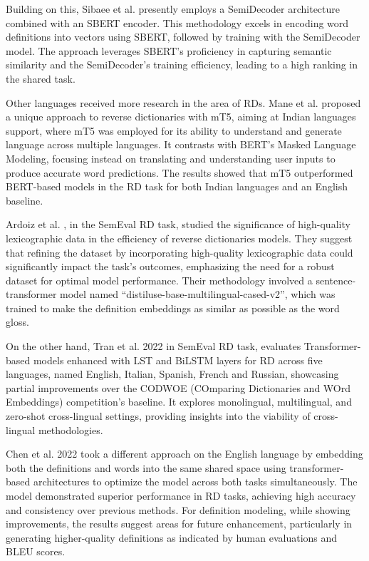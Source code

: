 \documentclass[12pt]{article}
\begin{document}
Building on this, Sibaee et al. \cite{Sibaee2023} presently employs a SemiDecoder architecture combined with an SBERT encoder. This methodology excels in encoding word definitions into vectors using SBERT, followed by training with the SemiDecoder model. The approach leverages SBERT's proficiency in capturing semantic similarity and the SemiDecoder's training efficiency, leading to a high ranking in the shared task.

Other languages received more research in the area of RDs. Mane et al. \cite{Mane2022} proposed a unique approach to reverse dictionaries with mT5, aiming at Indian languages support, where mT5 was employed for its ability to understand and generate language across multiple languages. It contrasts with BERT's Masked Language Modeling, focusing instead on translating and understanding user inputs to produce accurate word predictions. The results showed that mT5 outperformed BERT-based models in the RD task for both Indian languages and an English baseline.

Ardoiz et al. \cite{Ardoiz2022}, in the SemEval RD task, studied the significance of high-quality lexicographic data in the efficiency of reverse dictionaries models. They suggest that refining the dataset by incorporating high-quality lexicographic data could significantly impact the task's outcomes, emphasizing the need for a robust dataset for optimal model performance. Their methodology involved a sentence-transformer model named “distiluse-base-multilingual-cased-v2”, which was trained to make the definition embeddings as similar as possible as the word gloss.

On the other hand, Tran et al. 2022 \cite{Tran2022} in SemEval RD task, evaluates Transformer-based models enhanced with LST and BiLSTM layers for RD across five languages, named English, Italian, Spanish, French and Russian, showcasing partial improvements over the CODWOE (COmparing Dictionaries and WOrd Embeddings) competition's baseline. It explores monolingual, multilingual, and zero-shot cross-lingual settings, providing insights into the viability of cross-lingual methodologies.

Chen et al. 2022 \cite{Chen2022} took a different approach on the English language by embedding both the definitions and words into the same shared space using transformer-based architectures to optimize the model across both tasks simultaneously. The model demonstrated superior performance in RD tasks, achieving high accuracy and consistency over previous methods. For definition modeling, while showing improvements, the results suggest areas for future enhancement, particularly in generating higher-quality definitions as indicated by human evaluations and BLEU scores.
\end{document}
